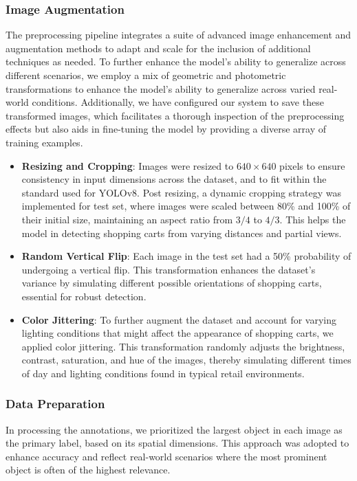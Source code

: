 \documentclass[10pt,twocolumn,letterpaper]{article}
\begin{document}
\subsubsection{Image Augmentation}
The preprocessing pipeline integrates a suite of advanced image enhancement and augmentation methods to adapt and scale for the inclusion of additional techniques as needed. To further enhance the model's ability to generalize across different scenarios, we employ a mix of geometric and photometric transformations to enhance the model’s ability to generalize across varied real-world conditions. Additionally, we have configured our system to save these transformed images, which facilitates a thorough inspection of the preprocessing effects but also aids in fine-tuning the model by providing a diverse array of training examples.
\begin{itemize}
    \item \textbf{Resizing and Cropping}: Images were resized to \(640 \times 640\) pixels to ensure consistency in input dimensions across the dataset, and to fit within the standard used for YOLOv8. Post resizing, a dynamic cropping strategy was implemented for test set, where images were scaled between 80\% and 100\% of their initial size, maintaining an aspect ratio from \(3/4\) to \(4/3\). This helps the model in detecting shopping carts from varying distances and partial views.
    \item \textbf{Random Vertical Flip}: Each image in the test set had a 50\% probability of undergoing a vertical flip. This transformation enhances the dataset's variance by simulating different possible orientations of shopping carts, essential for robust detection.
    \item \textbf{Color Jittering}: To further augment the dataset and account for varying lighting conditions that might affect the appearance of shopping carts, we applied color jittering. This transformation randomly adjusts the brightness, contrast, saturation, and hue of the images, thereby simulating different times of day and lighting conditions found in typical retail environments.
\end{itemize}

\subsubsection{Data Preparation}
In processing the annotations, we prioritized the largest object in each image as the primary label, based on its spatial dimensions. This approach was adopted to enhance accuracy and reflect real-world scenarios where the most prominent object is often of the highest relevance.
\end{document}
